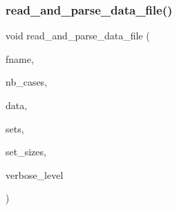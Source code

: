 \mbox{\label{util_8_c_aa4d6668fcc58f40de7a3b75adf1e8af0}} 
\subsubsection{\texorpdfstring{read\+\_\+and\+\_\+parse\+\_\+data\+\_\+file()}{read\_and\_parse\_data\_file()}}
{\footnotesize\ttfamily void read\+\_\+and\+\_\+parse\+\_\+data\+\_\+file (\begin{DoxyParamCaption}\item[{const \mbox{\hyperlink{galois_8h_ab6cc7b4aeb6ea31aba2b3fbfc83ff5e6}{B\+Y\+TE}} $\ast$}]{fname,  }\item[{\mbox{\hyperlink{galois_8h_a09fddde158a3a20bd2dcadb609de11dc}{I\+NT}} \&}]{nb\+\_\+cases,  }\item[{\mbox{\hyperlink{galois_8h_ab6cc7b4aeb6ea31aba2b3fbfc83ff5e6}{B\+Y\+TE}} $\ast$$\ast$\&}]{data,  }\item[{\mbox{\hyperlink{galois_8h_a09fddde158a3a20bd2dcadb609de11dc}{I\+NT}} $\ast$$\ast$\&}]{sets,  }\item[{\mbox{\hyperlink{galois_8h_a09fddde158a3a20bd2dcadb609de11dc}{I\+NT}} $\ast$\&}]{set\+\_\+sizes,  }\item[{\mbox{\hyperlink{galois_8h_a09fddde158a3a20bd2dcadb609de11dc}{I\+NT}}}]{verbose\+\_\+level }\end{DoxyParamCaption})}

\mbox{\label{util_8_c_aeb8585c8a2e92cfdfbe73d8995800de8}} 
